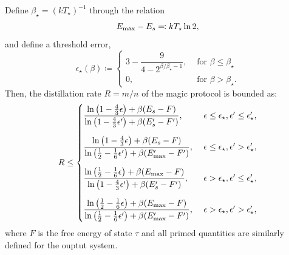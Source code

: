 \documentclass[pra,
aps,
twocolumn,
superscriptaddress,
groupedaddress,
nofootinbib,
reprint
]{revtex4-1}
\begin{document}
\begin{theorem}
Define $\beta_\star = (k T_\star)^{-1}$ through the relation
\begin{equation}
	E_{\rm max} - E_s \eqqcolon kT_\star \ln 2,
\end{equation}
and define a threshold error,
\begin{equation}\label{eq:threshold}
	\epsilon_{\star}(\beta) \coloneqq 
	\begin{cases}
		3 - \dfrac{9}{4-2^{\beta/\beta_\star - 1}}, &\text{ for } \beta \leq \beta_\star \\
		0, &\text{ for } \beta > \beta_\star.
	\end{cases}
\end{equation}
Then, the distillation rate $R = m/n$ of the magic protocol is bounded as:
\begin{equation}
	R \leq
	\begin{cases}
		\dfrac{\ln{\big( 1-\frac{4}{3}\epsilon \big)} + \beta (E_s - F)}{\ln{\big( 1-\frac{4}{3}\epsilon' \big)} + \beta (E'_s - F')},\ &\epsilon \leq \epsilon_\star, \epsilon' \leq \epsilon'_\star, \vspace{10pt}\\
		\dfrac{\ln{\big( 1-\frac{4}{3}\epsilon \big)} + \beta (E_s - F)}{\ln{\big( \frac{1}{2}-\frac{1}{6}\epsilon' \big)} + \beta (E'_{\rm{max}} - F')},\ &\epsilon \leq \epsilon_\star, \epsilon' > \epsilon'_\star, \vspace{10pt}\\
		\dfrac{\ln{\big( \frac{1}{2}-\frac{1}{6}\epsilon \big)} + \beta (E_{\rm{max}} - F)}{\ln{\big( 1-\frac{4}{3}\epsilon' \big)} + \beta (E'_s - F')},\ &\epsilon > \epsilon_\star, \epsilon' \leq \epsilon'_\star, \vspace{10pt}\\
		\dfrac{\ln{\big( \frac{1}{2}-\frac{1}{6}\epsilon \big)} + \beta (E_{\rm{max}} - F)}{\ln{\big( \frac{1}{2}-\frac{1}{6}\epsilon' \big)} + \beta (E'_{\rm{max}} - F')},\ &\epsilon > \epsilon_\star, \epsilon' > \epsilon'_\star,
	\end{cases}
\end{equation}
where $F$ is the free energy of state $\tau$ and all primed quantities are similarly defined for the ouptut system.
\end{theorem}
\end{document}
